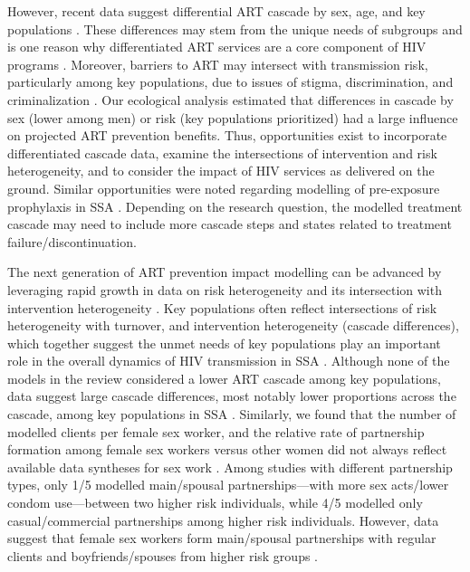 However, recent data suggest differential ART cascade by sex, age, and key populations
\cite{Lancaster2016,Stannah2019,Ma2020,Green2020}.
These differences may stem from the unique needs of subgroups
and is one reason why differentiated ART services are a core component of HIV programs
\cite{Chikwari2018,Ehrenkranz2019}.
Moreover, barriers to ART may intersect with transmission risk, particularly among key populations,
due to issues of stigma, discrimination, and criminalization \cite{Ortblad2019,Baral2019}.
Our ecological analysis estimated that
differences in cascade by sex (lower among men) or risk (key populations prioritized)
had a large influence on projected ART prevention benefits.
Thus, opportunities exist to incorporate differentiated cascade data,
examine the intersections of intervention and risk heterogeneity, and
to consider the impact of HIV services as delivered on the ground.
Similar opportunities were noted regarding modelling of pre-exposure prophylaxis in SSA \cite{Case2019}.
Depending on the research question, the modelled treatment cascade may need
to include more cascade steps and states related to treatment failure/discontinuation.
\par
The next generation of ART prevention impact modelling can be advanced by leveraging
rapid growth in data on risk heterogeneity and its intersection with intervention heterogeneity
\cite{Beyrer2012,Baral2012,Mishra2016}.
Key populations often reflect intersections of risk heterogeneity with turnover,
and intervention heterogeneity (cascade differences),
which together suggest the unmet needs of key populations
play an important role in the overall dynamics of HIV transmission in SSA \cite{Bekker2015,Stone2021}.
Although none of the models in the review considered a lower ART cascade among key populations,
data suggest large cascade differences, most notably lower proportions across the cascade,
among key populations in SSA \cite{Mountain2014,Hakim2018,Stannah2019}.
Similarly, we found that the number of modelled clients per female sex worker, and
the relative rate of partnership formation among female sex workers versus other women
did not always reflect available data syntheses for sex work \cite{Watts2010,Scorgie2012}.
Among studies with different partnership types, only 1/5 modelled
main/spousal partnerships---with more sex acts/lower condom use---between two higher risk individuals,
while 4/5 modelled only casual/commercial partnerships among higher risk individuals.
However, data suggest that female sex workers form main/spousal partnerships
with regular clients and boyfriends/spouses from higher risk groups \cite{Scorgie2012}.
